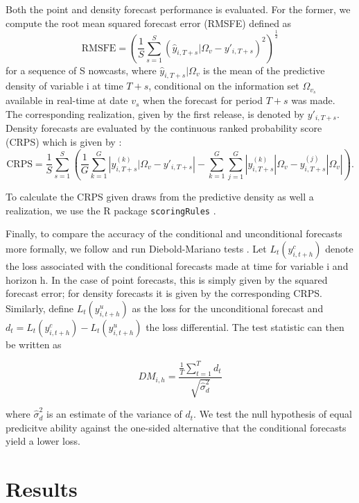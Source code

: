 \documentclass[notitlepage,a4paper,12pt]{article}
\begin{document}
Both the point and density forecast performance is evaluated. For the former, we compute the root mean squared forecast error (RMSFE) defined as
\begin{equation*}
\text{RMSFE} = \left( \frac{1}{S} \sum_{s=1}^S (\hat{y}_{i, T+s}|\Omega_{v} - y'_{i, T+s})^2 \right) ^{\frac{1}{2}}
\end{equation*}
for a sequence of S nowcasts, where $\hat{y}_{i, T+s}|\Omega_{v}$ is the mean of the predictive density of variable i at time $T+s$, conditional on the information set $\Omega_{v_s}$ available in real-time at date $v_s$ when the forecast for period $T+s$ was made. The corresponding realization, given by the first release, is denoted by $y'_{i,T+s}$. Density forecasts are evaluated by the continuous ranked probability score (CRPS) which is given by \citep[see][]{Gneitingetal2016}:
\begin{equation*}
\text{CRPS} = \frac{1}{S} \sum_{s=1}^{S} \left( \frac{1}{G} \sum_{k=1}^G \left\lvert {y}^{(k)}_{i,T+s}|\Omega_{v} - y'_{i, T+s} \right\rvert - \sum_{k=1}^G \sum_{j=1}^G \left\lvert {y}^{(k)}_{i,T+s}|\Omega_{v} - {y}^{(j)}_{i,T+s}|\Omega_{v} \right\rvert \right).
\end{equation*}

To calculate the CRPS given draws from the predictive density as well a realization, we use the R package \texttt{scoringRules} \citep{jkl_2019_jss}.

Finally, to compare the accuracy of the conditional and unconditional forecasts more formally, we follow \citet{ganicsodendahl_2021_ijf} and run Diebold-Mariano tests \citep{dm_1995_jbes}. Let $L_t(y^c_{i, t+h})$ denote the loss associated with the conditional forecasts made at time for variable i and horizon h. In the case of point forecasts, this is simply given by the squared forecast error; for density forecasts it is given by the corresponding CRPS. Similarly, define $L_t(y^u_{i, t+h})$ as the loss for the unconditional forecast and $d_t = L_t(y^c_{i, t+h}) - L_t(y^u_{i, t+h})$ the loss differential. The test statistic can then be written as 

$$
    DM_{i, h} = \frac{\frac{1}{T} \sum_{t=1}^{T} d_t}{\sqrt{\hat{\sigma}^2_d}}
$$

where $\hat{\sigma}^2_d$ is an estimate of the variance of $d_t$. We test the null hypothesis of equal predicitve ability against the one-sided alternative that the conditional forecasts yield a lower loss. 

\section{Results}
\end{document}
